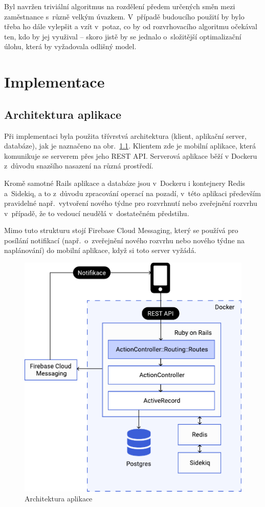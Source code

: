 \documentclass[twoside]{ctuthesis}
\begin{document}
Byl navržen triviální algoritmus na rozdělení předem určených směn mezi zaměstnance s~různě velkým úvazkem. V~případě budoucího použití by bylo třeba ho dále vylepšit a vzít v~potaz, co by od rozvrhovacího algoritmu očekával ten, kdo by jej využival – skoro jistě by se jednalo o~složitější optimalizační úlohu, která by vyžadovala odlišný model.



\chapter{Implementace}

\section{Architektura aplikace}

Při implementaci byla použita třívrstvá architektura (klient, aplikační server, databáze), jak je naznačeno na obr.~\ref{fig:architecture}. Klientem zde je mobilní aplikace, která komunikuje se serverem přes jeho REST API. Serverová aplikace běží v Dockeru z~důvodu snazšího nasazení na různá prostředí.

Kromě samotné Rails aplikace a databáze jsou v~Dockeru i kontejnery Redis a~Sidekiq, a to z~důvodu zpracování operací na pozadí, v~této aplikaci především pravidelné např.~vytvoření nového týdne pro rozvrhnutí nebo zveřejnění rozvrhu v~případě, že to vedoucí neudělá v~dostatečném předstihu.

Mimo tuto strukturu stojí Firebase Cloud Messaging, který se používá pro posílání notifikací (např.~o~zveřejnění nového rozvrhu nebo nového týdne na naplánování) do mobilní aplikace, když si toto server vyžádá.

\begin{figure}[h]
	\includegraphics[scale=0.7]{img/architecture.pdf}
	\caption{Architektura aplikace}
	\label{fig:architecture}
\end{figure}
\end{document}
